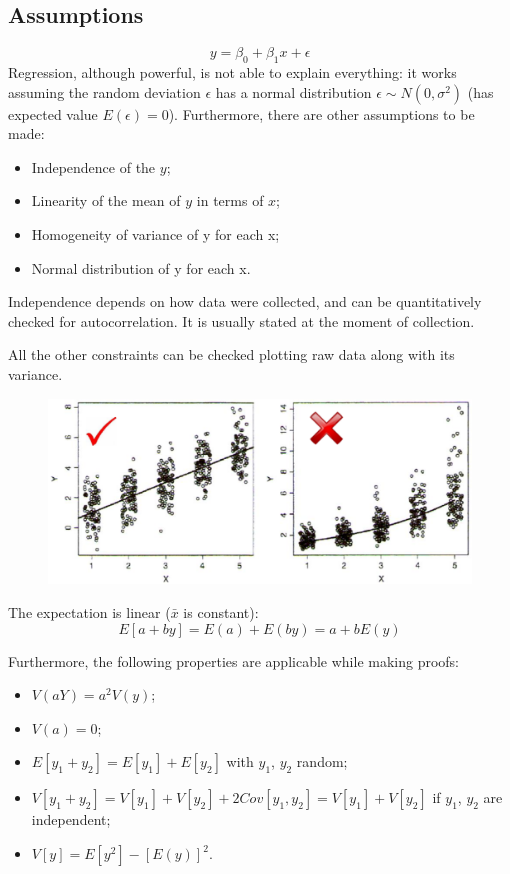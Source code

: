 \subsection{Assumptions}
$$y = \beta_0 + \beta_1x + \epsilon$$
Regression, although powerful, is not able to explain everything: it works assuming the random deviation $\epsilon$ has a normal distribution $\epsilon \sim N(0, \sigma^2)$ (has expected value $E(\epsilon) = 0$). Furthermore, there are other assumptions to be made:
\begin{itemize}
	\item Independence of the $y$;
	\item Linearity of the mean of $y$ in terms of $x$;
	\item Homogeneity of variance of y for each x;
	\item Normal distribution of y for each x.
\end{itemize}

Independence depends on how data were collected, and can be quantitatively checked for autocorrelation. It is usually stated at the moment of collection.

All the other constraints can be checked plotting raw data along with its variance.
\begin{figure}[h]
	\centering
	\includegraphics[scale=0.4]{lectures/images/assumptions.png}
\end{figure}

The expectation is linear ($\bar{x}$ is constant):
$$E[a + by] = E(a) + E(by) = a + bE(y)$$

Furthermore, the following properties are applicable while making proofs:
\begin{itemize}
	\item $V(aY) = a^2 V(y)$;
	\item $V(a) = 0$;
	\item $E[y_1 + y_2] = E[y_1] + E[y_2]$ with $y_1$, $y_2$ random;
	\item $V[y_1 + y_2] = V[y_1] + V[y_2] + 2Cov[y_1, y_2] = V[y_1] + V[y_2]$ if $y_1$, $y_2$ are independent;
	\item $V[y] = E[y^2] - [E(y)]^2$.
\end{itemize}

